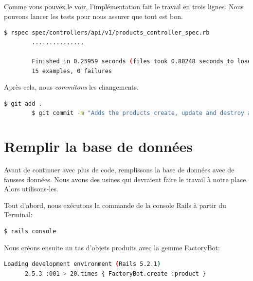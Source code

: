\documentclass[]{report}
\begin{document}
      Comme vous pouvez le voir, l'implémentation fait le travail en trois lignes. Nous pouvons lancer les tests pour nous assurer que tout est bon.

      \begin{scriptsize}
        \begin{lstlisting}[language=bash]
        $ rspec spec/controllers/api/v1/products_controller_spec.rb
        ...............

        Finished in 0.25959 seconds (files took 0.80248 seconds to load)
        15 examples, 0 failures
        \end{lstlisting}
      \end{scriptsize}

      Après cela, nous \textit{commitons} les changements.

      \begin{scriptsize}
        \begin{lstlisting}[language=bash]
        $ git add .
        $ git commit -m "Adds the products create, update and destroy action nested on the user resources"
        \end{lstlisting}
      \end{scriptsize}

  \section{Remplir la base de données}

    Avant de continuer avec plus de code, remplissons la base de données avec de fausses données. Nous avons des usines qui devraient faire le travail à notre place. Alors utilisons-les.

    Tout d'abord, nous exécutons la commande de la console Rails à partir du Terminal:

    \begin{scriptsize}
      \begin{lstlisting}[language=bash]
      $ rails console
      \end{lstlisting}
    \end{scriptsize}

    Nous créons ensuite un tas d'objets produits avec la gemme FactoryBot:

    \begin{scriptsize}
      \begin{lstlisting}[language=bash]
      Loading development environment (Rails 5.2.1)
      2.5.3 :001 > 20.times { FactoryBot.create :product }
      \end{lstlisting}
    \end{scriptsize}
\end{document}
